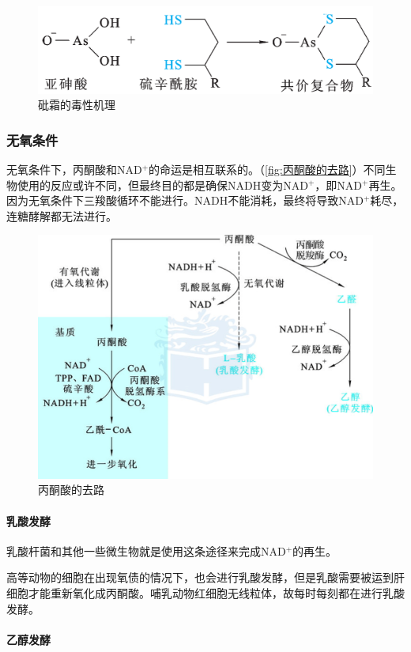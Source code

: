 \begin{figure}[htbp]
	\centering
	\includegraphics[width=0.5\linewidth]{Pics/砒霜有毒}
	\caption{砒霜的毒性机理}
	\label{fig:砒霜的毒性机理}
\end{figure}

\subsubsection{无氧条件}

无氧条件下，丙酮酸和NAD$^{+}$的命运是相互联系的。（\autoref{fig:丙酮酸的去路}）不同生物使用的反应或许不同，但最终目的都是确保NADH变为NAD$^{+}$，即NAD$^{+}$再生。因为无氧条件下三羧酸循环不能进行。NADH不能消耗，最终将导致NAD$^{+}$耗尽，连糖酵解都无法进行。

\begin{figure}[htbp]
	\centering
	\includegraphics[width=0.7\linewidth]{Pics/丙酮酸的去路}
	\caption{丙酮酸的去路}
	\label{fig:丙酮酸的去路}
\end{figure}

\paragraph{乳酸发酵}

乳酸杆菌和其他一些微生物就是使用这条途径来完成NAD$^{+}$的再生。

高等动物的细胞在出现氧债的情况下，也会进行乳酸发酵，但是乳酸需要被运到肝细胞才能重新氧化成丙酮酸。哺乳动物红细胞无线粒体，故每时每刻都在进行乳酸发酵。

\paragraph{乙醇发酵}

